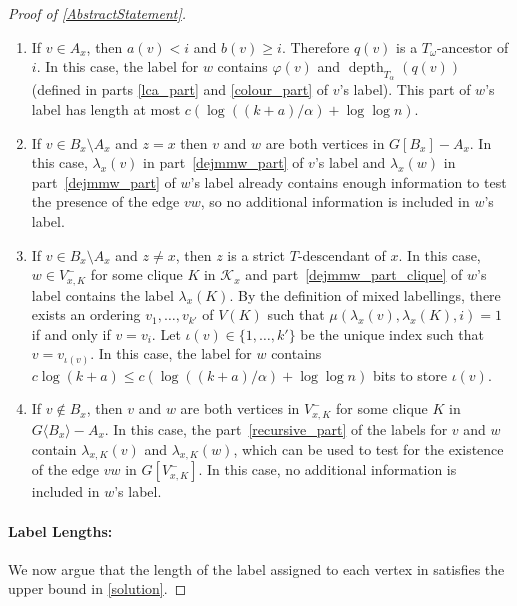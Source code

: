 \documentclass{patmorin}
\newcommand{\torso}[2]{{#1}\langle{#2}\rangle}
\DeclareMathOperator{\depth}{depth}
\renewcommand{\ge}{\geqslant}
\renewcommand{\le}{\leqslant}
\begin{document}
\begin{proof}[Proof of \cref{AbstractStatement}]
\begin{enumerate}[nosep,nolistsep,label=(P\arabic*)]
      \begin{enumerate}[nosep,nolistsep,label=(P8\alph*)]
        \item\label{q_part} If $v\in A_x$, then $a(v)<i$ and $b(v)\ge i$. Therefore $q(v)$ is a $T_\omega$-ancestor of $i$.  In this case, the label for $w$ contains $\varphi(v)$ and $\depth_{T_\alpha}(q(v))$ (defined in parts \ref{lca_part} and \ref{colour_part} of $v$'s label). This part of $w$'s label has length at most $c(\log((k+a)/\alpha) + \log\log n)$.

        \item\label{nothing_part} If $v\in B_x\setminus A_x$ and $z=x$ then $v$ and $w$ are both vertices in $G[B_x]-A_x$. In this case, $\lambda_x(v)$ in part~\ref{dejmmw_part} of $v$'s label and $\lambda_x(w)$ in part~\ref{dejmmw_part} of $w$'s label already contains enough information to test the presence of the edge $vw$, so no additional information is included in $w$'s label.

        \item\label{clique_part} If $v\in B_x\setminus A_x$ and $z\neq x$, then $z$ is a strict $T$-descendant of $x$.  In this case, $w\in V^-_{x,K}$ for some clique $K$ in $\mathcal{K}_x$ and part~\ref{dejmmw_part_clique} of $w$'s label contains the label $\lambda_x(K)$.  By the definition of mixed labellings, there exists an ordering $v_1,\ldots,v_{k'}$ of $V(K)$ such that $\mu(\lambda_x(v),\lambda_x(K),i)=1$ if and only if $v=v_i$. Let $\iota(v)\in\{1,\ldots,k'\}$ be the unique index such that $v=v_{\iota(v)}$.  In this case, the label for $w$ contains $c\log (k+a)\le c(\log((k+a)/\alpha)+\log\log n)$ bits to store $\iota(v)$.

        \item If $v\not\in B_x$, then $v$ and $w$ are both vertices in $V^-_{x,K}$ for some clique $K$ in $\torso{G}{B_x}-A_x$.  In this case, the part~\ref{recursive_part} of the labels for $v$ and $w$ contain $\lambda_{x,K}(v)$ and $\lambda_{x,K}(w)$, which can be used to test for the existence of the edge $vw$ in $G[V^-_{x,K}]$. In this case, no additional information is included in $w$'s label.
      \end{enumerate}
    \end{enumerate}

    \paragraph{Label Lengths:}  We now argue that the length of the label assigned to each vertex in satisfies the upper bound in \cref{solution}.


\end{proof}
\end{document}
